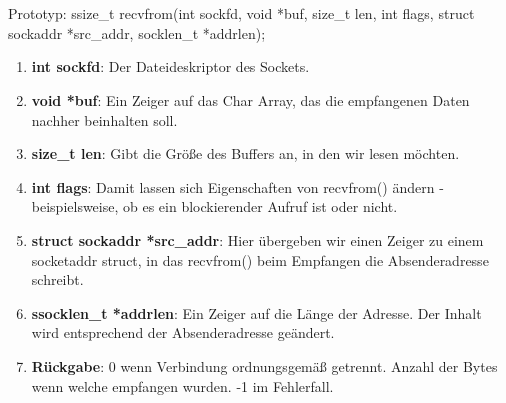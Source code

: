 \\\\
Prototyp: ssize\_t recvfrom(int sockfd, void *buf, size\_t len, int flags, struct sockaddr *src\_addr, socklen\_t *addrlen);
\begin{enumerate}
    \item \textbf{int sockfd}: Der Dateideskriptor des Sockets.
    \item \textbf{void *buf}: Ein Zeiger auf das Char Array, das die empfangenen Daten nachher beinhalten soll. 
    \item \textbf{size\_t len}: Gibt die Größe des Buffers an, in den wir lesen möchten.
    \item \textbf{int flags}: Damit lassen sich Eigenschaften von recvfrom() ändern - beispielsweise, ob es ein blockierender Aufruf ist oder nicht.
    \item \textbf{struct sockaddr *src\_addr}: Hier übergeben wir einen Zeiger zu einem socketaddr struct, in das recvfrom() beim Empfangen die Absenderadresse schreibt.
    \item \textbf{ssocklen\_t *addrlen}: Ein Zeiger auf die Länge der Adresse. Der Inhalt wird entsprechend der Absenderadresse geändert.
    \item \textbf{Rückgabe}: 0 wenn Verbindung ordnungsgemäß getrennt. Anzahl der Bytes wenn welche empfangen wurden. -1 im Fehlerfall.
\end{enumerate} 
\ \\%

